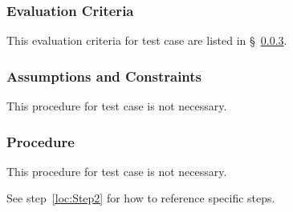 \subsubsection{Evaluation Criteria}
\label{loc:TestCaseEvaluationCriteria\StsTestSpecID\StsTestCaseID}


This evaluation criteria for test \StsTestSpecID{} case \StsTestCaseID{} are listed in \S~\ref{loc:TestCaseProcedure\StsTestSpecID\StsTestCaseID}.

\subsubsection{Assumptions and Constraints}
\label{loc:TestCaseAssumptions\StsTestSpecID\StsTestCaseID}


This procedure for test \StsTestSpecID{} case \StsTestCaseID{} is not necessary.

\subsubsection{Procedure}
\label{loc:TestCaseProcedure\StsTestSpecID\StsTestCaseID}


This procedure for test \StsTestSpecID{} case \StsTestCaseID{} is not necessary.

See step~\ref{loc:Step2} for how to reference specific steps.

